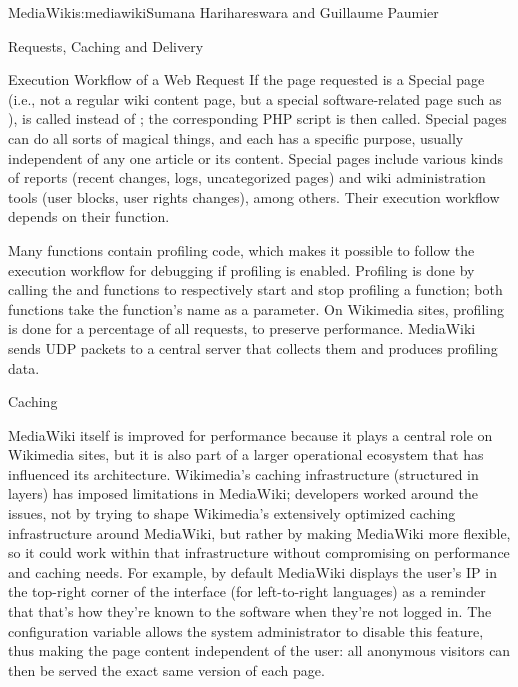 \begin{aosachapter}{MediaWiki}{s:mediawiki}{Sumana Harihareswara and Guillaume Paumier}
\begin{aosasect1}{Requests, Caching and Delivery}
\begin{aosasect2}{Execution Workflow of a Web Request}
If the page requested is a Special page (i.e., not a regular wiki
content page, but a special software-related page such as
),  is called
instead of ; the corresponding PHP script is
then called. Special pages can do all sorts of magical things, and
each has a specific purpose, usually independent of any one article or
its content. Special pages include various kinds of reports (recent
changes, logs, uncategorized pages) and wiki administration tools
(user blocks, user rights changes), among others. Their execution
workflow depends on their function.

Many functions contain profiling code, which makes it possible to
follow the execution workflow for debugging if profiling is
enabled. Profiling is done by calling the  and
 functions to respectively start and stop profiling
a function; both functions take the function's name as a parameter. On
Wikimedia sites, profiling is done for a percentage of all requests,
to preserve performance. MediaWiki sends UDP packets to a central
server that collects them and produces profiling data.

\end{aosasect2}

\begin{aosasect2}{Caching}

MediaWiki itself is improved for performance because it plays a
central role on Wikimedia sites, but it is also part of a larger
operational ecosystem that has influenced its
architecture. Wikimedia's caching infrastructure (structured in
layers) has imposed limitations in MediaWiki; developers worked around
the issues, not by trying to shape Wikimedia's extensively optimized
caching infrastructure around MediaWiki, but rather by making
MediaWiki more flexible, so it could work within that infrastructure
without compromising on performance and caching needs. For example, by
default MediaWiki displays the user's IP in the top-right corner of
the interface (for left-to-right languages) as a reminder that that's
how they're known to the software when they're not logged in. The
 configuration variable allows the system
administrator to disable this feature, thus making the page content
independent of the user: all anonymous visitors can then be served the
exact same version of each page.


\end{aosasect2}
\end{aosasect1}
\end{aosachapter}
